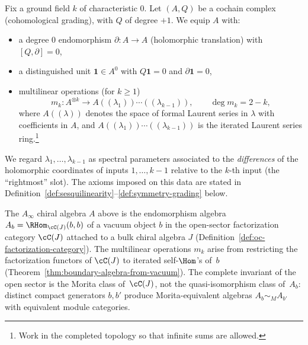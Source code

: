 \begin{definition}
\label{def:ainfty_chiral}
Fix a ground field $k$ of characteristic $0$. Let $(A,Q)$ be a cochain complex (cohomological grading), with $Q$ of degree $+1$.
We equip $A$ with:
\begin{itemize}
 \item a degree $0$ endomorphism $\partial\colon A\to A$ (holomorphic translation) with $[Q,\partial]=0$,
 \item a distinguished unit $\mathbf 1\in A^0$ with $Q\mathbf 1=0$ and $\partial \mathbf 1=0$,
 \item multilinear operations (for $k\ge 1$)
 \begin{equation}
 \label{eq:mk-type}
 m_k \colon A^{\otimes k}\longrightarrow A((\lambda_1))\cdots((\lambda_{k-1})),
 \qquad \deg m_k = 2-k,
 \end{equation}
 where $A((\lambda))$ denotes the space of formal Laurent series in $\lambda$ with coefficients in $A$, and $A((\lambda_1))\cdots((\lambda_{k-1}))$ is the iterated Laurent series ring.\footnote{Work in the completed topology so that infinite sums are allowed.}
\end{itemize}
We regard $\lambda_1,\dots,\lambda_{k-1}$ as spectral parameters associated to the \emph{differences} of the holomorphic coordinates of inputs $1,\dots,k-1$ relative to the $k$-th input (the ``rightmost'' slot).
The axioms imposed on this data are stated in Definition~\ref{def:sesquilinearity}--\ref{def:symmetry-grading} below.
\end{definition}

\begin{remark}
\label{rem:categorical-origin}
The $A_\infty$ chiral algebra $A$ above is the endomorphism algebra $A_b = \RHom_{\cC(J)}(b,b)$ of a vacuum object $b$ in the open-sector factorization category $\cC(J)$ attached to a bulk chiral algebra $J$ (Definition~\ref{def:oc-factorization-category}). The multilinear operations $m_k$ arise from restricting the factorization functors of $\cC(J)$ to iterated self-$\Hom$'s of~$b$ (Theorem~\ref{thm:boundary-algebra-from-vacuum}). The complete invariant of the open sector is the Morita class of~$\cC(J)$, not the quasi-isomorphism class of~$A_b$: distinct compact generators $b, b'$ produce Morita-equivalent algebras $A_b \sim_M A_{b'}$ with equivalent module categories.
\end{remark}

